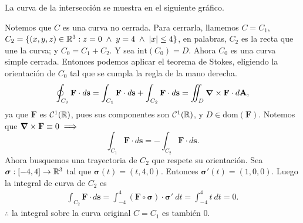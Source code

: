 
\begin{solution} 
La curva de la intersecci\'on se muestra en el siguiente gr\'afico.

\begin{center}
\end{center}

  Notemos que $C$ es una curva no cerrada. Para cerrarla, llamemos $C=C_1$, 
  $C_2=\{(x,y,z)\in\mathbb{R}^3:z=0\;\land\;y=4\;\land\;|x|\leq4\}$, en palabras, $C_2$ es la recta que une la curva; y $C_0=C_1+C_2$. Y sea $\text{int}(C_0)=D$. Ahora $C_0$ es una curva simple cerrada. Entonces podemos aplicar el teorema de Stokes, eligiendo la orientaci\'on de $C_0$ tal que se cumpla la regla de la mano derecha.
  \[
      \oint_{C_0}\mathbf{F}\cdot d\mathbf{s}= \int_{C_1}\mathbf{F}\cdot d\mathbf{s} + \int_{C_2}\mathbf{F}\cdot d\mathbf{s} = \iint_D \grad\times\mathbf{F}\cdot d\mathbf{A},
  \]
  ya que $\mathbf{F}$ es $\mathcal{C}^1(\mathbb{R})$, pues sus componentes son $\mathcal{C}^1(\mathbb{R})$, y $D\in\text{dom}(\mathbf{F})$.
  Notemos que $\grad\times\mathbf{F}\equiv0\implies$
  \[
     \int_{C_1}\mathbf{F}\cdot d\mathbf{s} =- \int_{C_2}\mathbf{F}\cdot d\mathbf{s}.
  \]
  Ahora busquemos una trayectoria de $C_2$ que respete su orientaci\'on. Sea $\boldsymbol{\sigma}:[-4,4]\rightarrow\mathbb{R}^3$
  tal que $\boldsymbol{\sigma}(t)=(t,4,0)$. Entonces $\boldsymbol{\sigma}'(t)=(1,0,0)$. Luego la integral de curva de $C_2$ es
  \begin{gather*}
    \int_{C_2}\mathbf{F}\cdot d\mathbf{s}
    =\int_{-4}^4 (\mathbf{F}\circ\boldsymbol{\sigma})\cdot\boldsymbol{\sigma}'\:dt
    =\int_{-4}^4 t\:dt = 0.
  \end{gather*}
  $\therefore$ la integral sobre la curva original $C=C_1$ es tambi\'en 0.
\end{solution}


